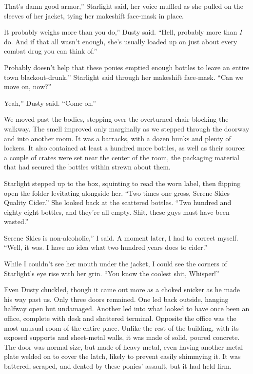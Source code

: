 \leavevmode{}That’s damn good armor,” Starlight said, her voice muffled as she pulled on the sleeves of her jacket, tying her makeshift face-mask in place.

\leavevmode{}It probably weighs more than you do,” Dusty said. “Hell, probably more than \textit{I} do. And if that all wasn’t enough, she’s usually loaded up on just about every combat drug you can think of.”

\leavevmode{}Probably doesn’t help that these ponies emptied enough bottles to leave an entire town blackout-drunk,” Starlight said through her makeshift face-mask. “Can we move on, now?”

\leavevmode{}Yeah,” Dusty said. “Come on.”

We moved past the bodies, stepping over the overturned chair blocking the walkway. The smell improved only marginally as we stepped through the doorway and into another room. It was a barracks, with a dozen bunks and plenty of lockers. It also contained at least a hundred more bottles, as well as their source: a couple of crates were set near the center of the room, the packaging material that had secured the bottles within strewn about them.

Starlight stepped up to the box, squinting to read the worn label, then flipping open the folder levitating alongside her. “Two times one gross, Serene Skies Quality Cider.” She looked back at the scattered bottles. “Two hundred and eighty eight bottles, and they’re all empty. Shit, these guys must have been wasted.”

\leavevmode{}Serene Skies is non-alcoholic,” I said. A moment later, I had to correct myself. “Well, it was. I have no idea what two hundred years does to cider.”

While I couldn’t see her mouth under the jacket, I could see the corners of Starlight’s eye rise with her grin. “You know the coolest shit, Whisper!”

Even Dusty chuckled, though it came out more as a choked snicker as he made his way past us. Only three doors remained. One led back outside, hanging halfway open but undamaged. Another led into what looked to have once been an office, complete with desk and shattered terminal. Opposite the office was the most unusual room of the entire place. Unlike the rest of the building, with its exposed supports and sheet-metal walls, it was made of solid, poured concrete. The door was normal size, but made of heavy metal, even having another metal plate welded on to cover the latch, likely to prevent easily shimmying it. It was battered, scraped, and dented by these ponies’ assault, but it had held firm.

